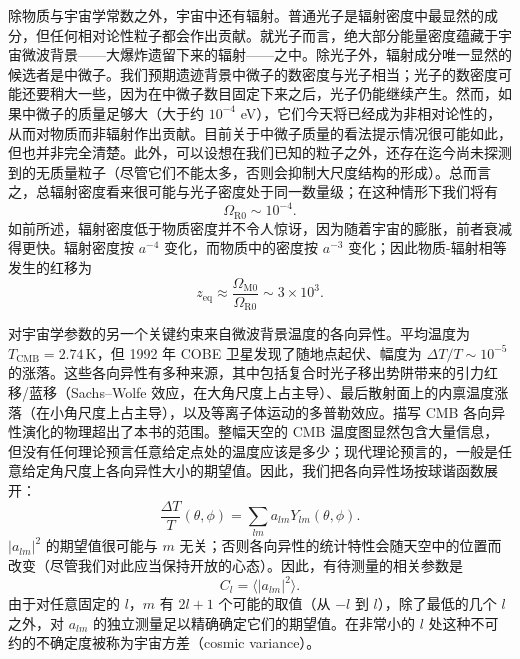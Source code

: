 除物质与宇宙学常数之外，宇宙中还有辐射。普通光子是辐射密度中最显然的成分，但任何相对论性粒子都会作出贡献。就光子而言，绝大部分能量密度蕴藏于宇宙微波背景——大爆炸遗留下来的辐射——之中。除光子外，辐射成分唯一显然的候选者是中微子。我们预期遗迹背景中微子的数密度与光子相当；光子的数密度可能还要稍大一些，因为在中微子数目固定下来之后，光子仍能继续产生。然而，如果中微子的质量足够大（大于约 $10^{-4}$ eV），它们今天将已经成为非相对论性的，从而对物质而非辐射作出贡献。目前关于中微子质量的看法提示情况很可能如此，但也并非完全清楚。此外，可以设想在我们已知的粒子之外，还存在迄今尚未探测到的无质量粒子（尽管它们不能太多，否则会抑制大尺度结构的形成）。总而言之，总辐射密度看来很可能与光子密度处于同一数量级；在这种情形下我们将有
\begin{equation*}
\Omega_{\mathrm{R}0} \sim 10^{-4}.
\tag{8.157}
\end{equation*}
如前所述，辐射密度低于物质密度并不令人惊讶，因为随着宇宙的膨胀，前者衰减得更快。辐射密度按 $a^{-4}$ 变化，而物质中的密度按 $a^{-3}$ 变化；因此物质-辐射相等发生的红移为
\begin{equation*}
z_{\mathrm{eq}} \approx \frac{\Omega_{\mathrm{M}0}}{\Omega_{\mathrm{R}0}} \sim 3\times 10^{3}.
\tag{8.158}
\end{equation*}

对宇宙学参数的另一个关键约束来自微波背景温度的各向异性。平均温度为 $T_{\mathrm{CMB}}=2.74\,\mathrm{K}$，但 1992 年 COBE 卫星发现了随地点起伏、幅度为 $\Delta T/T\sim 10^{-5}$ 的涨落。这些各向异性有多种来源，其中包括复合时光子移出势阱带来的引力红移/蓝移（Sachs--Wolfe 效应，在大角尺度上占主导）、最后散射面上的内禀温度涨落（在小角尺度上占主导），以及等离子体运动的多普勒效应。描写 CMB 各向异性演化的物理超出了本书的范围。整幅天空的 CMB 温度图显然包含大量信息，但没有任何理论预言任意给定点处的温度应该是多少；现代理论预言的，一般是任意给定角尺度上各向异性大小的期望值。因此，我们把各向异性场按球谐函数展开：
\begin{equation*}
\frac{\Delta T}{T}(\theta,\phi) = \sum_{lm} a_{lm}Y_{lm}(\theta,\phi).
\tag{8.159}
\end{equation*}
$|a_{lm}|^{2}$ 的期望值很可能与 $m$ 无关；否则各向异性的统计特性会随天空中的位置而改变（尽管我们对此应当保持开放的心态）。因此，有待测量的相关参数是
\begin{equation*}
C_l = \langle|a_{lm}|^{2}\rangle.
\tag{8.160}
\end{equation*}
由于对任意固定的 $l$，$m$ 有 $2l+1$ 个可能的取值（从 $-l$ 到 $l$），除了最低的几个 $l$ 之外，对 $a_{lm}$ 的独立测量足以精确确定它们的期望值。在非常小的 $l$ 处这种不可约的不确定度被称为宇宙方差（cosmic variance）。

